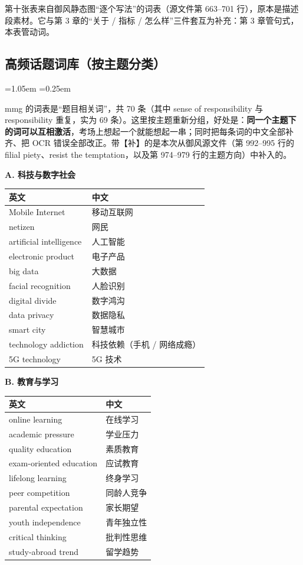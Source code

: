 \documentclass[11pt,a4paper]{ctexart}
\newcommand{\impr}[1]{\par\addvspace{3pt}\noindent{\bfseries【本次改进】}#1\par\addvspace{3pt}}
\newenvironment{note}{%
  \par\addvspace{5pt}%
  \begin{list}{}{\leftmargin=1.05em \rightmargin=0.25em \listparindent=0pt
    \itemindent=0pt \topsep=0pt \parsep=2pt \itemsep=2pt \partopsep=0pt}%
  \item\relax\small\color{ink}%
}{%
  \end{list}\addvspace{5pt}%
}
\begin{document}
\impr{第十张表来自御风静态图“逐个写法”的词表（源文件第 663--701 行），原本是描述段素材。它与第 3 章的“关于 / 指标 / 怎么样”三件套互为补充：第 3 章管句式，本表管动词。}

\subsection{高频话题词库（按主题分类）}

\begin{note}
mmg 的词表是“题目相关词”，共 70 条（其中 sense of responsibility 与 responsibility 重复，实为 69 条）。这里按主题重新分组，好处是：\textbf{同一个主题下的词可以互相激活}，考场上想起一个就能想起一串；同时把每条词的中文全部补齐、把 OCR 错误全部改正。带【补】的是本次从御风源文件（第 992--995 行的 filial piety、resist the temptation，以及第 974--979 行的主题方向）中补入的。
\end{note}

\par\addvspace{5pt}\noindent\textbf{A. 科技与数字社会}\par\addvspace{2pt}
\begin{longtable}{L{5.8cm}L{10.2cm}}
\toprule
\textbf{英文} & \textbf{中文} \\
\midrule
\endhead
Mobile Internet & 移动互联网 \\
netizen & 网民 \\
artificial intelligence & 人工智能 \\
electronic product & 电子产品 \\
big data & 大数据 \\
facial recognition & 人脸识别 \\
digital divide & 数字鸿沟 \\
data privacy & 数据隐私 \\
smart city & 智慧城市 \\
technology addiction & 科技依赖（手机 / 网络成瘾） \\
5G technology & 5G 技术 \\
\bottomrule
\end{longtable}

\par\addvspace{5pt}\noindent\textbf{B. 教育与学习}\par\addvspace{2pt}
\begin{longtable}{L{5.8cm}L{10.2cm}}
\toprule
\textbf{英文} & \textbf{中文} \\
\midrule
\endhead
online learning & 在线学习 \\
academic pressure & 学业压力 \\
quality education & 素质教育 \\
exam-oriented education & 应试教育 \\
lifelong learning & 终身学习 \\
peer competition & 同龄人竞争 \\
parental expectation & 家长期望 \\
youth independence & 青年独立性 \\
critical thinking & 批判性思维 \\
study-abroad trend & 留学趋势 \\
\bottomrule
\end{longtable}
\end{document}
